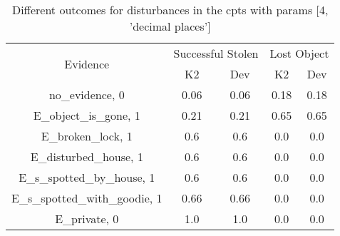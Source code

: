 \begin{table}\begin{tabular}{c|cc|cc}\toprule\multirow{2}{*}{Evidence} & \multicolumn{2}{c}{Successful Stolen} & \multicolumn{2}{c}{Lost Object} \\& {K2} & {Dev} & {K2} & {Dev} \\\midrule
no\_evidence, 0 & 0.06&0.06&0.18&0.18\\E\_object\_is\_gone, 1 & 0.21&0.21&0.65&0.65\\E\_broken\_lock, 1 & 0.6&0.6&0.0&0.0\\E\_disturbed\_house, 1 & 0.6&0.6&0.0&0.0\\E\_s\_spotted\_by\_house, 1 & 0.6&0.6&0.0&0.0\\E\_s\_spotted\_with\_goodie, 1 & 0.66&0.66&0.0&0.0\\E\_private, 0 & 1.0&1.0&0.0&0.0\\\bottomrule\end{tabular}\caption{Different outcomes for disturbances in the cpts with params [4, 'decimal places']}\end{table}